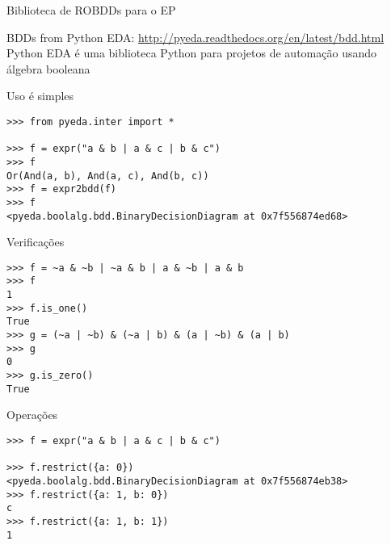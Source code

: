 \expandafter\documentclass\expandafter[table, usenames, svgnames, dvipsnames,14pt, \classopts]{beamer}
\begin{document}
\begin{frame}{Biblioteca de ROBDDs para o EP}

    \begin{outline}
        \1 BDDs from Python EDA: \url{http://pyeda.readthedocs.org/en/latest/bdd.html}
            \2[-] Python EDA é uma biblioteca Python para projetos de automação
            \2[-] usando álgebra booleana
    \end{outline}

\end{frame}

\begin{frame}[fragile]{Uso é simples}

\small
\begin{verbatim}
>>> from pyeda.inter import *
        
>>> f = expr("a & b | a & c | b & c")
>>> f
Or(And(a, b), And(a, c), And(b, c))
>>> f = expr2bdd(f)
>>> f
<pyeda.boolalg.bdd.BinaryDecisionDiagram at 0x7f556874ed68>
\end{verbatim}

\end{frame}

\begin{frame}[fragile]{Verificações}

\small
\begin{verbatim}
>>> f = ~a & ~b | ~a & b | a & ~b | a & b
>>> f
1
>>> f.is_one()
True
>>> g = (~a | ~b) & (~a | b) & (a | ~b) & (a | b)
>>> g
0
>>> g.is_zero()
True
\end{verbatim}

\end{frame}

\begin{frame}[fragile]{Operações}

\small
\begin{verbatim}
>>> f = expr("a & b | a & c | b & c")

>>> f.restrict({a: 0})
<pyeda.boolalg.bdd.BinaryDecisionDiagram at 0x7f556874eb38>
>>> f.restrict({a: 1, b: 0})
c
>>> f.restrict({a: 1, b: 1})
1
\end{verbatim}

\end{frame}
\end{document}
